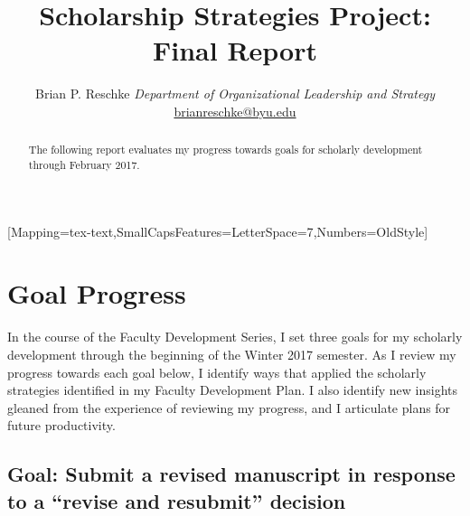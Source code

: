 \documentclass[11pt,article,oneside]{memoir}
\author{\Large Brian P. Reschke\vspace{0.05in} \newline\normalsize\emph{Department of Organizational Leadership and Strategy} \newline\footnotesize \protect\url{brianreschke@byu.edu}\vspace*{0.2in}\newline }
\date{}
\def\mytitle{\LARGE Scholarship Strategies Project: Final Report}
\begin{document}


\setmainfont{Minion Pro}[Mapping=tex-text,SmallCapsFeatures={LetterSpace=7},Numbers=OldStyle]
\setsansfont[Mapping=tex-text]{Minion Pro}
\setmonofont[Mapping=tex-text,Scale=0.9]{Inconsolata}
\pagestyle{kjh}
\setcounter{secnumdepth}{-1}


\title{\mytitle}
\maketitle



\begin{abstract}

\noindent The following report evaluates my progress towards goals for scholarly
development through February 2017.

\end{abstract}


\section{Goal Progress}\label{goal-progress}

In the course of the Faculty Development Series, I set three goals for
my scholarly development through the beginning of the Winter 2017
semester. As I review my progress towards each goal below, I identify
ways that applied the scholarly strategies identified in my Faculty
Development Plan. I also identify new insights gleaned from the
experience of reviewing my progress, and I articulate plans for future
productivity.

\subsection{\texorpdfstring{Goal: Submit a revised manuscript in
response to a \enquote{revise and resubmit}
decision}{Goal: Submit a revised manuscript in response to a revise and resubmit decision}}\label{goal-submit-a-revised-manuscript-in-response-to-a-revise-and-resubmit-decision}
\end{document}
